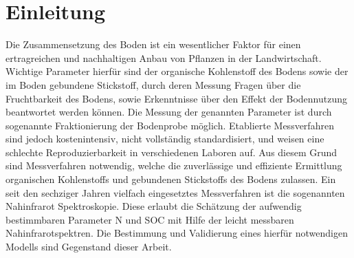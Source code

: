 \section{Einleitung}
\label{sec:Einleitung}

    Die Zusammensetzung des Boden ist ein wesentlicher Faktor für einen ertragreichen und nachhaltigen Anbau von Pflanzen in der Landwirtschaft.
    Wichtige Parameter hierfür sind der organische Kohlenstoff des Bodens sowie der im Boden gebundene Stickstoff, durch deren Messung Fragen über die Fruchtbarkeit des Bodens, sowie Erkenntnisse über den Effekt der Bodennutzung beantwortet werden können.\cite{Poeplau2013}
    Die Messung der genannten Parameter ist durch sogenannte Fraktionierung der Bodenprobe möglich.
    Etablierte Messverfahren sind jedoch kostenintensiv, nicht vollständig standardisiert, und weisen eine schlechte Reproduzierbarkeit in verschiedenen Laboren auf.\cite{Poeplau2013}
    Aus diesem Grund sind Messverfahren notwendig, welche die zuverlässige und effiziente Ermittlung organischen Kohlenstoffs und gebundenen Stickstoffs des Bodens zulassen.
    Ein seit den sechziger Jahren vielfach eingesetztes Messverfahren ist die sogenannten Nahinfrarot Spektroskopie. \cite{Agelet2010}
    Diese erlaubt die Schätzung der aufwendig bestimmbaren Parameter N und SOC mit Hilfe der leicht messbaren Nahinfrarotspektren.
    Die Bestimmung und Validierung eines hierfür notwendigen Modells sind Gegenstand dieser Arbeit.

	
